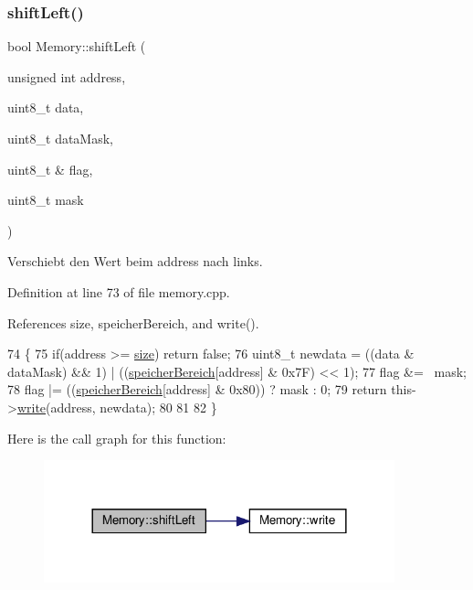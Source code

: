 \subsubsection{\texorpdfstring{shift\+Left()}{shiftLeft()}}
{\footnotesize\ttfamily bool Memory\+::shift\+Left (\begin{DoxyParamCaption}\item[{unsigned int}]{address,  }\item[{uint8\+\_\+t}]{data,  }\item[{uint8\+\_\+t}]{data\+Mask,  }\item[{uint8\+\_\+t \&}]{flag,  }\item[{uint8\+\_\+t}]{mask }\end{DoxyParamCaption})}

Verschiebt den Wert beim {\ttfamily address} nach links. 

Definition at line 73 of file memory.\+cpp.



References size, speicher\+Bereich, and write().


\begin{DoxyCode}
74 \{
75     \textcolor{keywordflow}{if}(address >= \mbox{\hyperlink{class_memory_a97e5472d284e8daceeb740acb2170ae0}{size}}) \textcolor{keywordflow}{return} \textcolor{keyword}{false};
76     uint8\_t newdata = ((data & dataMask) && 1) | ((\mbox{\hyperlink{class_memory_a31e171332b705e39bb13e421c7863a5f}{speicherBereich}}[address] & 0x7F) << 1); 
77     flag &= ~mask;
78     flag |= ((\mbox{\hyperlink{class_memory_a31e171332b705e39bb13e421c7863a5f}{speicherBereich}}[address] & 0x80)) ? mask : 0;
79     \textcolor{keywordflow}{return} this->\mbox{\hyperlink{class_memory_a0e00ea7d13e602be37af361426aa3a50}{write}}(address, newdata);
80     
81 
82 \}
\end{DoxyCode}
Here is the call graph for this function\+:
\nopagebreak
\begin{figure}[H]
\begin{center}
\leavevmode
\includegraphics[width=288pt]{class_memory_a274d126eea46f966a36a2eb69da949ab_cgraph}
\end{center}
\end{figure}
\mbox{\label{class_memory_af57be7a362ba6670fc983ac5cceb34a5}} 
